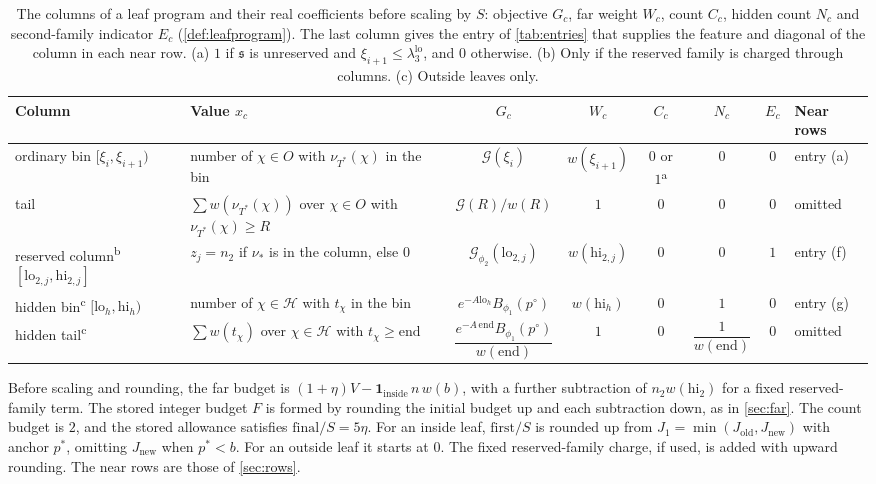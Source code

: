 \documentclass[11pt]{amsart}
\numberwithin{equation}{section}
\theoremstyle{plain}
\theoremstyle{definition}
\theoremstyle{remark}
\newcommand{\lo}{\mathrm{lo}}
\newcommand{\hi}{\mathrm{hi}}
\newcommand{\1}{\mathbf{1}}
\begin{document}
\begin{table}[ht]
\centering
\footnotesize
\setlength{\tabcolsep}{3.5pt}
\renewcommand{\arraystretch}{1.35}
\begin{tabular}{@{}>{\raggedright\arraybackslash}p{2.25cm}>{\raggedright\arraybackslash}p{3.3cm}cccccl@{}}
\toprule
Column & Value $x_c$ & $G_c$ & $W_c$ & $C_c$ & $N_c$ & $E_c$ & Near rows\\
\midrule
ordinary bin $[\xi_i,\xi_{i+1})$ & number of $\chi\in O$ with $\nu_{T^*}(\chi)$ in the bin & $\mathcal G(\xi_i)$ &
  $w(\xi_{i+1})$ & $0$ or $1$\textsuperscript{a} & $0$ & $0$ & entry (a)\\
tail & $\sum w(\nu_{T^*}(\chi))$ over $\chi\in O$ with $\nu_{T^*}(\chi)\ge R$ & $\mathcal G(R)/w(R)$ & $1$ & $0$ &
  $0$ & $0$ & omitted\\
reserved column\textsuperscript{b} $[\lo_{2,j},\hi_{2,j}]$ & $z_j=n_2$ if $\nu_*$ is in the column, else $0$ &
  $\mathcal G_{\phi_2}(\lo_{2,j})$ & $w(\hi_{2,j})$ & $0$ & $0$ & $1$ & entry (f)\\
hidden bin\textsuperscript{c} $[\lo_h,\hi_h)$ & number of $\chi\in\mathcal H$ with $t_\chi$ in the bin &
  $e^{-A\lo_h}B_{\phi_1}(p^\circ)$ & $w(\hi_h)$ & $0$ & $1$ & $0$ & entry (g)\\
hidden tail\textsuperscript{c} & $\sum w(t_\chi)$ over $\chi\in\mathcal H$ with $t_\chi\ge\mathrm{end}$ &
  $\dfrac{e^{-A\,\mathrm{end}}B_{\phi_1}(p^\circ)}{w(\mathrm{end})}$ & $1$ & $0$ & $\dfrac1{w(\mathrm{end})}$ & $0$ &
  omitted\\
\bottomrule
\end{tabular}
\caption{The columns of a leaf program and their real coefficients before scaling by $S$:
objective $G_c$, far weight $W_c$, count $C_c$, hidden count $N_c$ and second-family indicator
$E_c$ (\cref{def:leafprogram}). The last column gives the entry of \cref{tab:entries} that supplies
the feature and diagonal of the column in each near row. (a) $1$ if $\mathfrak s$ is unreserved
and $\xi_{i+1}\le\lambda_3^{\lo}$, and $0$ otherwise. (b) Only if the reserved family is charged
through columns. (c) Outside leaves only.}
\label{tab:leafmodel}
\end{table}
Before scaling and rounding, the far budget is $(1+\eta)V-\1_{\mathrm{inside}}\,n\,w(b)$,
with a further subtraction of $n_2w(\hi_2)$ for a fixed reserved-family term.
The stored integer budget $F$ is formed by rounding the initial budget up and each
subtraction down, as in \cref{sec:far}. The count budget is $2$, and the stored
allowance satisfies $\mathrm{final}/S=5\eta$.
For an inside leaf, $\mathrm{first}/S$ is rounded up from
$J_1=\min(J_{\mathrm{old}},J_{\mathrm{new}})$ with anchor $p^*$, omitting
$J_{\mathrm{new}}$ when $p^*<b$. For an outside leaf it starts at $0$.
The fixed reserved-family charge, if used, is added with upward rounding.
The near rows are those of \cref{sec:rows}.
\end{document}

